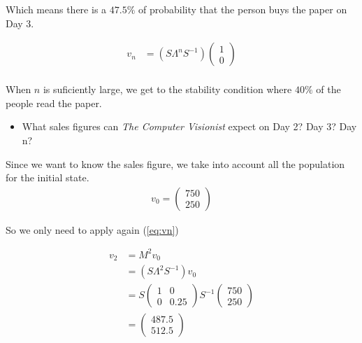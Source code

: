 \documentclass{article}
\begin{document}
Which means there is a $47.5\%$ of probability that the person buys the paper on Day 3.

\begin{equation}
\begin{aligned}
v_n &= (S\Lambda^n S^{-1}) 
	\left(
	\begin{array}{c}
	1  \\
	0 
	 \end{array}
	 \right) \\
\end{aligned}
\end{equation}

When $n$ is suficiently large, we get to the stability condition where
$40\%$ of the people read the paper.

\begin{itemize}

\item What sales figures can \textit{The Computer Visionist} expect
on Day 2? Day 3? Day n?
\end{itemize} 

Since we want to know the sales figure,
we take into account all the population for the initial state.
\begin{equation*}
\begin{aligned}
v_0 = \left(
\begin{array}{c}
750\\ 
250 
 \end{array}
 \right) 
\end{aligned}
\end{equation*} 

So we only need to apply again (\ref{eq:vn}) 

\begin{equation}
\begin{aligned}
v_2 &= M^2 v_0 \\ 
	&=(S\Lambda^2 S^{-1}) v_0\\
	     &=  
	S
	\begin{pmatrix}
	1 & 0 \\ 
	0 & 0.25
	\end{pmatrix}
	S^{-1} 
	\left(
	\begin{array}{c}
	750 \\ 
	250 
	 \end{array}
	 \right) \\
	  &=
	  \left(
	  \begin{array}{c}
	  487.5\\ 
	  512.5 
	   \end{array}
	   \right) 
\end{aligned}
\end{equation}
\end{document}
